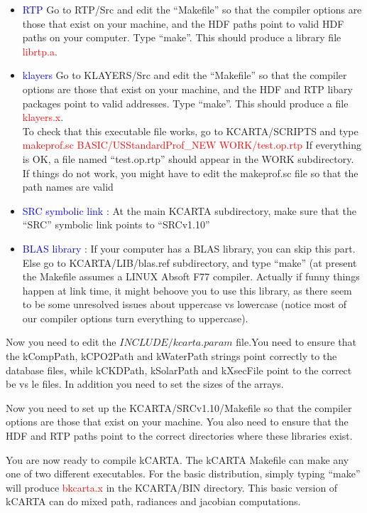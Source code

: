 \documentclass[11pt]{article}
\newcommand{\kc}{\textsf{kCARTA}\xspace}
\begin{document}
\begin{itemize}
\item \textcolor{blue} {RTP} Go to RTP/Src and edit the ``Makefile'' so that 
the compiler options are those that exist on your machine, and the HDF
paths point to valid HDF paths on your computer. Type ``make''. This
should produce a library file \textcolor{red}{librtp.a}.
\item \textcolor{blue} {klayers} Go to KLAYERS/Src and edit the 
``Makefile'' so that the compiler options are those that exist on your 
machine, and the HDF and RTP libary packages point to valid addresses. 
Type ``make''. This should produce a file \textcolor{red}{klayers.x}.\\
To check that this executable file works, go to KCARTA/SCRIPTS and type 
\textcolor{red} {makeprof.sc BASIC/USStandardProf\_NEW WORK/test.op.rtp}
If everything is OK, a file named ``test.op.rtp'' should appear in the WORK
subdirectory. If things do not work, you might have to edit the makeprof.sc
file so that the path names are valid
\item \textcolor{blue} {SRC symbolic link} :  At the main KCARTA 
subdirectory, make sure that the ``SRC'' symbolic link points to ``SRCv1.10''
\item \textcolor{blue} {BLAS library} : If your computer has a BLAS library, 
you can skip this part. Else go to KCARTA/LIB/blas.ref subdirectory, and 
type ``make'' (at present the Makefile assumes a LINUX Absoft F77 compiler.
Actually if funny things happen at link time, it might behoove you to use this
library, as there seem to be some unresolved issues about uppercase vs 
lowercase (notice most of our compiler options turn everything to uppercase).
\end{itemize}

Now you need to edit the $INCLUDE/kcarta.param$ file.You need to ensure that 
the kCompPath, kCPO2Path and kWaterPath strings point correctly to the 
database files, while kCKDPath, kSolarPath and kXsecFile point to the correct 
be vs le files. In addition you need to set the sizes of the arrays.

Now you need to set up the KCARTA/SRCv1.10/Makefile so that the compiler 
options are those that exist on your machine.  You also need to ensure that 
the HDF and RTP paths point to the correct directories where these libraries 
exist. 

You are now ready to compile \kc. The \kc Makefile can make any one of two 
different executables. For the basic distribution, simply typing ``make'' will
produce \textcolor{red} {bkcarta.x} in the KCARTA/BIN directory. This basic
version of \kc can do mixed path, radiances and jacobian computations.
\end{document}
